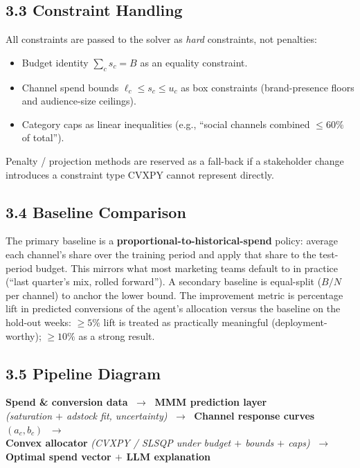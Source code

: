 \documentclass[11pt]{article}
\begin{document}
\subsection*{3.3 \; Constraint Handling}

All constraints are passed to the solver as \emph{hard} constraints, not penalties:
\begin{itemize}[leftmargin=2em, itemsep=1pt]
  \item Budget identity $\sum_c s_c = B$ as an equality constraint.
  \item Channel spend bounds $\ell_c \le s_c \le u_c$ as box constraints (brand-presence floors and audience-size ceilings).
  \item Category caps as linear inequalities (e.g., ``social channels combined $\le 60\%$ of total'').
\end{itemize}
Penalty / projection methods are reserved as a fall-back if a stakeholder change introduces a constraint type CVXPY cannot represent directly.

\subsection*{3.4 \; Baseline Comparison}

The primary baseline is a \textbf{proportional-to-historical-spend} policy: average each channel's share over the training period and apply that share to the test-period budget. This mirrors what most marketing teams default to in practice (``last quarter's mix, rolled forward''). A secondary baseline is equal-split ($B/N$ per channel) to anchor the lower bound. The improvement metric is percentage lift in predicted conversions of the agent's allocation versus the baseline on the hold-out weeks: $\ge 5\%$ lift is treated as practically meaningful (deployment-worthy); $\ge 10\%$ as a strong result.

\subsection*{3.5 \; Pipeline Diagram}

\begin{center}
\small
\textbf{Spend \& conversion data}
$\;\longrightarrow\;$
\textbf{MMM prediction layer}\\
\textit{(saturation $+$ adstock fit, uncertainty)}
$\;\longrightarrow\;$
\textbf{Channel response curves} $(a_c, b_c)$
$\;\longrightarrow\;$\\
\textbf{Convex allocator}
\textit{(CVXPY / SLSQP under budget $+$ bounds $+$ caps)}
$\;\longrightarrow\;$
\textbf{Optimal spend vector $+$ LLM explanation}
\end{center}
\end{document}
